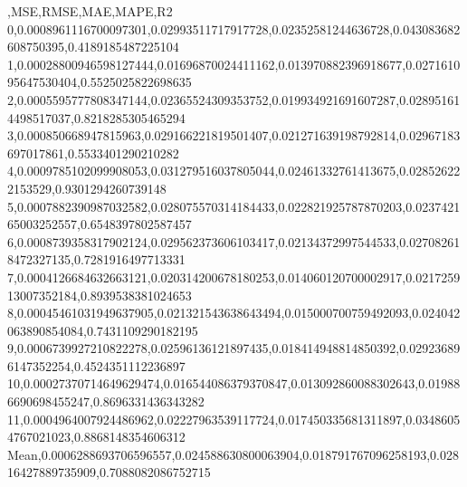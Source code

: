 ,MSE,RMSE,MAE,MAPE,R2
0,0.0008961116700097301,0.02993511717917728,0.02352581244636728,0.043083682608750395,0.4189185487225104
1,0.00028800946598127444,0.01696870024411162,0.013970882396918677,0.027161095647530404,0.5525025822698635
2,0.0005595777808347144,0.02365524309353752,0.019934921691607287,0.028951614498517037,0.8218285305465294
3,0.000850668947815963,0.029166221819501407,0.021271639198792814,0.02967183697017861,0.5533401290210282
4,0.0009785102099908053,0.031279516037805044,0.02461332761413675,0.028526222153529,0.9301294260739148
5,0.0007882390987032582,0.028075570314184433,0.022821925787870203,0.023742165003252557,0.6548397802587457
6,0.0008739358317902124,0.029562373606103417,0.02134372997544533,0.027082618472327135,0.7281916497713331
7,0.0004126684632663121,0.020314200678180253,0.014060120700002917,0.021725913007352184,0.8939538381024653
8,0.00045461031949637905,0.021321543638643494,0.015000700759492093,0.024042063890854084,0.7431109290182195
9,0.0006739927210822278,0.02596136121897435,0.018414948814850392,0.029236896147352254,0.4524351112236897
10,0.00027370714649629474,0.016544086379370847,0.013092860088302643,0.019886690698455247,0.8696331436343282
11,0.0004964007924486962,0.02227963539117724,0.017450335681311897,0.03486054767021023,0.8868148354606312
Mean,0.0006288693706596557,0.024588630800063904,0.018791767096258193,0.02816427889735909,0.7088082086752715
